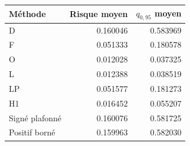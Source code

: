 \begin{tabular}{lrr}
\toprule Méthode & Risque moyen & $q_{0,95}$ moyen\\\midrule
D & 0.160046 & 0.583969\\
F & 0.051333 & 0.180578\\
O & 0.012028 & 0.037325\\
L & 0.012388 & 0.038519\\
LP & 0.051577 & 0.181273\\
H1 & 0.016452 & 0.055207\\
Signé plafonné & 0.160076 & 0.581725\\
Positif borné & 0.159963 & 0.582030\\
\bottomrule
\end{tabular}
